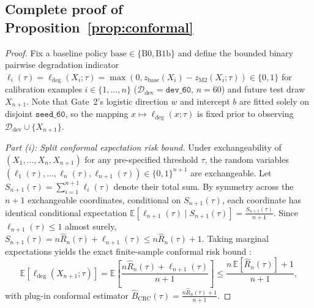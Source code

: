 \documentclass{article}
\begin{document}
\subsection{Complete proof of Proposition~\ref{prop:conformal}}
\begin{proof}
Fix a baseline policy $\mathrm{base} \in \{\mathrm{B0}, \mathrm{B1b}\}$ and define the bounded binary pairwise degradation indicator $\ell_i(\tau) = \ell_{\mathrm{deg}}(X_i; \tau) = \max(0, z_{\mathrm{base}}(X_i) - z_{\mathrm{M2}}(X_i; \tau)) \in \{0, 1\}$ for calibration examples $i \in \{1, \dots, n\}$ ($\mathcal{D}_{\mathrm{dev}} = \texttt{dev\_60}$, $n=60$) and future test draw $X_{n+1}$. Note that Gate~2's logistic direction $w$ and intercept $b$ are fitted solely on disjoint $\texttt{seed\_60}$, so the mapping $x \mapsto \ell_{\mathrm{deg}}(x; \tau)$ is fixed prior to observing $\mathcal{D}_{\mathrm{dev}} \cup \{X_{n+1}\}$.

\emph{Part (i): Split conformal expectation risk bound.} Under exchangeability of $(X_1, \dots, X_n, X_{n+1})$ for any pre-specified threshold $\tau$, the random variables $(\ell_1(\tau), \dots, \ell_n(\tau), \ell_{n+1}(\tau)) \in \{0, 1\}^{n+1}$ are exchangeable. Let $S_{n+1}(\tau) = \sum_{i=1}^{n+1} \ell_i(\tau)$ denote their total sum. By symmetry across the $n+1$ exchangeable coordinates, conditional on $S_{n+1}(\tau)$, each coordinate has identical conditional expectation $\mathbb{E}[\ell_{n+1}(\tau) \mid S_{n+1}(\tau)] = \frac{S_{n+1}(\tau)}{n+1}$. Since $\ell_{n+1}(\tau) \le 1$ almost surely, $S_{n+1}(\tau) = n\hat{R}_n(\tau) + \ell_{n+1}(\tau) \le n\hat{R}_n(\tau) + 1$. Taking marginal expectations yields the exact finite-sample conformal risk bound \cite{wang2026conformal}:
\begin{equation}
\mathbb{E}\!\left[\ell_{\mathrm{deg}}(X_{n+1}; \tau)\right] = \mathbb{E}\!\left[\frac{n\hat{R}_n(\tau) + \ell_{n+1}(\tau)}{n+1}\right] \le \frac{n\,\mathbb{E}[\hat{R}_n(\tau)] + 1}{n + 1},
\end{equation}
with plug-in conformal estimator $\hat{B}_{\mathrm{CRC}}(\tau) = \frac{n\hat{R}_n(\tau) + 1}{n + 1}$.


\end{proof}
\end{document}
